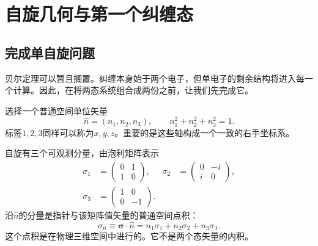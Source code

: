 \chapter{自旋几何与第一个纠缠态}


\section{完成单自旋问题}

贝尔定理可以暂且搁置。纠缠本身始于两个电子，但单电子的剩余结构将进入每一个计算。因此，在将两态系统组合成两份之前，让我们先完成它。

选择一个普通空间单位矢量
\begin{equation}
  \hat n=(n_1,n_2,n_3),
  \qquad
  n_1^2+n_2^2+n_3^2=1.
  \label{eq:l04-unit-pointer}
\end{equation}
标签\(1,2,3\)同样可以称为\(x,y,z\)。重要的是这些轴构成一个一致的右手坐标系。

\begin{classroomqa}
\end{classroomqa}

自旋有三个可观测分量，由泡利矩阵表示
\begin{equation}
  \begin{aligned}
    \sigma_1&=
    \begin{pmatrix}0&1\\1&0\end{pmatrix},
    &
    \sigma_2&=
    \begin{pmatrix}0&-i\\i&0\end{pmatrix},\\[0.5em]
    \sigma_3&=
    \begin{pmatrix}1&0\\0&-1\end{pmatrix}.
  \end{aligned}
\end{equation}
沿\(\hat n\)的分量是指针与该矩阵值矢量的普通空间点积：
\begin{equation}
  \sigma_{\hat n}
  \equiv
  \boldsymbol{\sigma}\cdot\hat n
  =
  n_1\sigma_1+n_2\sigma_2+n_3\sigma_3.
  \label{eq:l04-sigma-dot-n}
\end{equation}
这个点积是在物理三维空间中进行的。它不是两个态矢量的内积。

